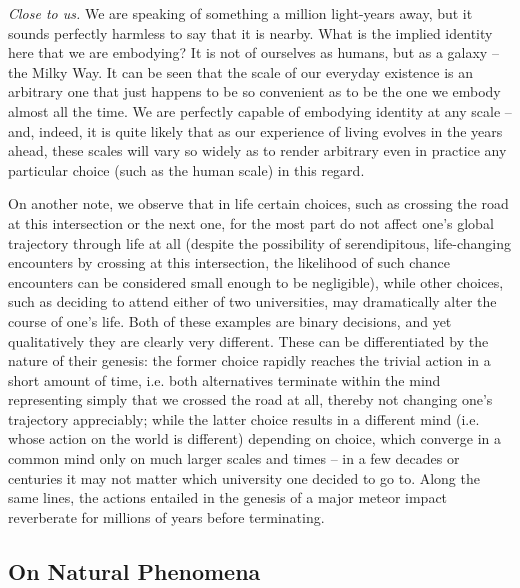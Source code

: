 \documentclass[pra,twocolumn,groupedaddress,10pt]{revtex4}
\theoremstyle{definition}
\begin{document}
\textit{Close to us.} We are speaking of something a million light-years away, but it sounds perfectly harmless to say that it is nearby. What is the implied identity here that we are embodying? It is not of ourselves as humans, but as a galaxy -- the Milky Way. It can be seen that the scale of our everyday existence is an arbitrary one that just happens to be so convenient as to be the one we embody almost all the time. We are perfectly capable of embodying identity at any scale -- and, indeed, it is quite likely that as our experience of living evolves in the years ahead, these scales will vary so widely as to render arbitrary even in practice any particular choice (such as the human scale) in this regard.

On another note, we observe that in life certain choices, such as crossing the road at this intersection or the next one, for the most part do not affect one's global trajectory through life at all (despite the possibility of serendipitous, life-changing encounters by crossing at this intersection, the likelihood of such chance encounters can be considered small enough to be negligible), while other choices, such as deciding to attend either of two universities, may dramatically alter the course of one's life. Both of these examples are binary decisions, and yet qualitatively they are clearly very different. These can be differentiated by the nature of their genesis: the former choice rapidly reaches the trivial action in a short amount of time, i.e. both alternatives terminate within the mind representing simply that we crossed the road at all, thereby not changing one's trajectory appreciably; while the latter choice results in a different mind (i.e. whose action on the world is different) depending on choice, which converge in a common mind only on much larger scales and times -- in a few decades or centuries it may not matter which university one decided to go to. Along the same lines, the actions entailed in the genesis of a major meteor impact reverberate for millions of years before terminating. %

\subsection{On Natural Phenomena} \label{sec:natphe}
\end{document}
